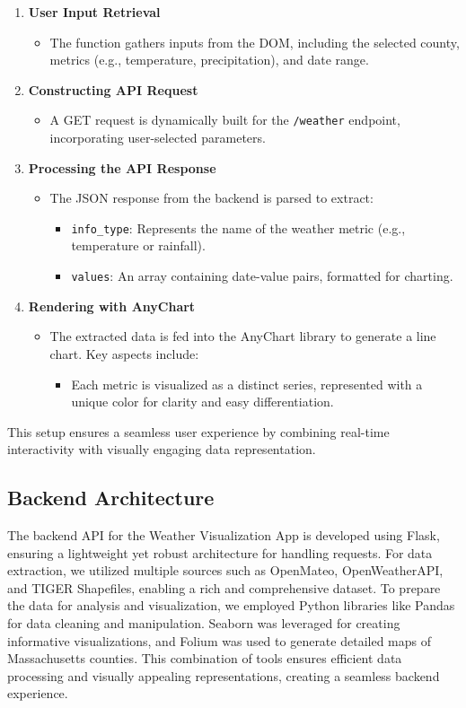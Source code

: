 \documentclass[a4paper, 12pt]{article}
\begin{document}
\begin{enumerate}
    \item \textbf{User Input Retrieval}
    \begin{itemize}
        \item The function gathers inputs from the DOM, including the selected county, metrics (e.g., temperature, precipitation), and date range.
    \end{itemize}
    \item \textbf{Constructing API Request}
    \begin{itemize}
        \item A GET request is dynamically built for the \texttt{/weather} endpoint, incorporating user-selected parameters.
    \end{itemize}
    \item \textbf{Processing the API Response}
    \begin{itemize}
        \item The JSON response from the backend is parsed to extract:
        \begin{itemize}
            \item \texttt{info\_type}: Represents the name of the weather metric (e.g., temperature or rainfall).
            \item \texttt{values}: An array containing date-value pairs, formatted for charting.
        \end{itemize}
    \end{itemize}
    \item \textbf{Rendering with AnyChart}
    \begin{itemize}
        \item The extracted data is fed into the AnyChart library to generate a line chart. Key aspects include:
        \begin{itemize}
            \item Each metric is visualized as a distinct series, represented with a unique color for clarity and easy differentiation.
        \end{itemize}
    \end{itemize}
\end{enumerate}
This setup ensures a seamless user experience by combining real-time interactivity with visually engaging data representation.

\subsection{Backend Architecture}
The backend API for the Weather Visualization App is developed using Flask, ensuring a lightweight yet robust architecture for handling requests. For data extraction, we utilized multiple sources such as OpenMateo, OpenWeatherAPI, and TIGER Shapefiles, enabling a rich and comprehensive dataset.
To prepare the data for analysis and visualization, we employed Python libraries like Pandas for data cleaning and manipulation. Seaborn was leveraged for creating informative visualizations, and Folium was used to generate detailed maps of Massachusetts counties. This combination of tools ensures efficient data processing and visually appealing representations, creating a seamless backend experience.
\end{document}
